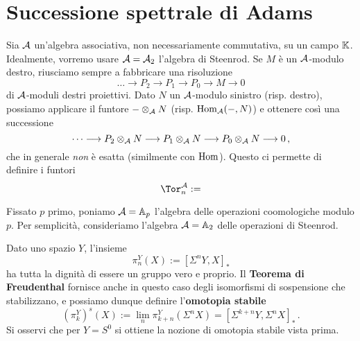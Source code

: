 \section{Successione spettrale di Adams}

Sia $\mathcal{A}$ un'algebra associativa, non necessariamente commutativa, su un campo $\mathbb{K}$.
Idealmente, vorremo usare $\mathcal{A} = \mathcal{A}_{2}$ l'algebra di Steenrod.
Se $M$ è un $\mathcal{A}$-modulo destro, riusciamo sempre a fabbricare una risoluzione
\begin{equation*}
	\dots \longrightarrow P_{2} \longrightarrow P_{1} 
	\longrightarrow P_{0} \longrightarrow M \longrightarrow 0
\end{equation*}
di $\mathcal{A}$-moduli destri proiettivi. Dato $N$ un $\mathcal{A}$-modulo
sinistro (risp. destro), possiamo applicare il funtore
$- \otimes_{\mathcal{A}} N$ (risp. $\operatorname{Hom}_{\mathcal{A}}(-,N)$)
e ottenere così una successione
\begin{equation*}
	\dots \longrightarrow P_{2} \otimes_{\mathcal{A}} N \longrightarrow P_{1} \otimes_{\mathcal{A}} N
	\longrightarrow P_{0} \otimes_{\mathcal{A}} N \longrightarrow 0\,,
\end{equation*}
che in generale \emph{non} è esatta (similmente con $\operatorname{Hom}$).
Questo ci permette di definire i funtori
\begin{equation*}
	\Tor^{\Aa}_{n} :=
\end{equation*}

Fissato $p$ primo, poniamo $\mathcal{A} = \mathbb{A}_{p}$ l'algebra delle operazioni coomologiche
modulo $p$. Per semplicità, consideriamo l'algebra $\mathcal{A} = \mathbb{A}_{2}$
delle operazioni di Steenrod.

Dato uno spazio $Y$, l'insieme
\begin{equation*}
	\pi_{n}^{Y}(X) := [\Sigma^{n} Y , X]_{*}
\end{equation*}
ha tutta la dignità di essere un gruppo vero e proprio.
Il \textbf{Teorema di Freudenthal} fornisce anche in questo
caso degli isomorfismi di sospensione che stabilizzano, 
e possiamo dunque definire l'\textbf{omotopia stabile}
\begin{equation*}
	(\pi_{k}^{Y})^{s}(X) := \lim_{n} \pi^{Y}_{k+n}(\Sigma^{n} X) 
	= [\Sigma^{k+n} Y , \Sigma^{n} X]_{*}\,.
\end{equation*}
Si osservi che per $Y=S^{0}$ si ottiene la nozione di omotopia stabile vista prima.

